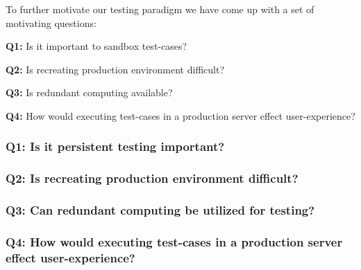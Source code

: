To further motivate our testing paradigm we have come up with a set of motivating questions:

\begin{compactitem}
\setlength{\itemsep}{1Pt}
\item[]\textbf{Q1:} Is it important to sandbox test-cases?
\item[]\textbf{Q2:} Is recreating production environment difficult? 
\item[]\textbf{Q3:} Is redundant computing available? 
\item[]\textbf{Q4:} How would executing test-cases in a production server effect user-experience?
\end{compactitem}

\subsubsection{\textbf{Q1:} Is it persistent testing important?}
\subsubsection{\textbf{Q2:} Is recreating production environment difficult?}
\subsubsection{\textbf{Q3:} Can redundant computing be utilized for testing?}
\subsubsection{\textbf{Q4:} How would executing test-cases in a production server effect user-experience?}
